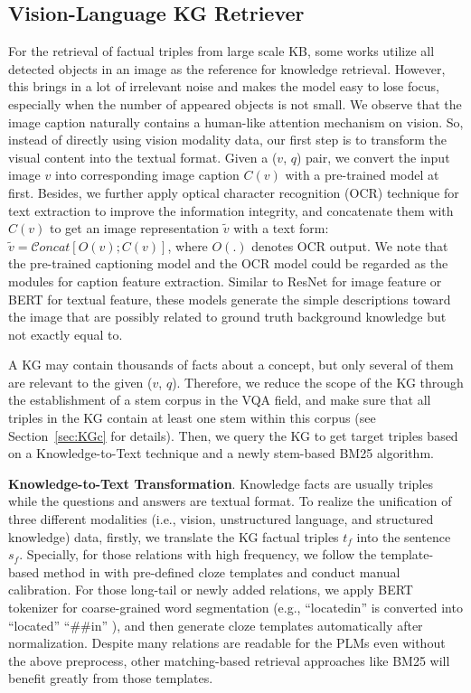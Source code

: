 \documentclass[sigconf]{acmart}
\begin{document}
\subsection{Vision-Language KG Retriever}
For the retrieval of factual triples from large scale KB, some works \citep{DBLP:conf/mm/Li0020,DBLP:conf/nips/NarasimhanLS18} utilize all detected objects in an image as the reference for knowledge retrieval. 
However, this brings in a lot of irrelevant noise and makes the model easy to lose focus, especially when the number of appeared objects is not small.
We observe that the image caption naturally contains a human-like attention mechanism on vision. 
So, instead of directly using vision modality data, our first step is to transform the visual content into the textual format.
Given a ($v$, $q$) pair, we convert the input image $v$ into corresponding image caption $C(v)$ with a pre-trained model at first. 
Besides, we further apply optical character recognition (OCR) technique \citep{DBLP:journals/corr/VeitMNMB16} for text extraction to improve the information integrity, and concatenate them with $C(v)$ to get an image representation $\tilde{v}$ with a text form:
$\tilde{v}=\mathcal{C}oncat[O(v);C(v)]$, where $O(.)$ denotes OCR output.
We note that  the pre-trained captioning model and the OCR model could be regarded as the modules for  caption feature extraction. Similar to ResNet \cite{DBLP:conf/cvpr/HeZRS16} for image feature or BERT \cite{DBLP:conf/naacl/DevlinCLT19} for textual feature, these models generate the simple descriptions toward the image  that are possibly related to ground truth background knowledge but not exactly equal to.

A KG may contain thousands of facts about a concept, but only several of them are relevant to the given ($v$, $q$).
Therefore, we reduce the scope of the KG through the establishment of a stem corpus in the VQA field, and make sure that all triples in the KG contain at least one stem within this corpus (see Section~\ref{sec:KGc} for details).
Then, we query the KG to get target triples based on a Knowledge-to-Text technique and a newly stem-based BM25 \citep{DBLP:journals/ftir/RobertsonZ09} algorithm.

\noindent\textbf{Knowledge-to-Text Transformation}. Knowledge facts are usually triples while the questions and answers are textual format. To realize the unification of three different modalities (i.e., vision, unstructured language, and structured knowledge) data, firstly, we translate the KG factual triples $t_{f}$ into  the sentence $s_{f}$. 
Specially, for those relations with high frequency, we follow the template-based method in \citep{DBLP:conf/aaai/BianH0021,DBLP:conf/eacl/HeinzerlingI21} with pre-defined cloze templates and conduct manual calibration.
For those long-tail or newly added relations, 
we apply BERT \citep{DBLP:conf/naacl/DevlinCLT19} tokenizer for coarse-grained word segmentation (e.g., ``locatedin'' is converted into ``located'' ``\#\#in'' ), and then generate cloze templates automatically after normalization.
Despite many relations are readable for the PLMs even without the above preprocess, other matching-based retrieval approaches like BM25 will benefit greatly from those templates.
\end{document}
